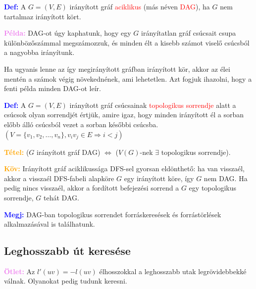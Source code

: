 \documentclass[../szamtud.tex]{subfiles}
\begin{document}
        \textcolor{blue}{\textbf{Def:}} A $G = (V,E)$ irányított gráf \textcolor{red}{aciklikus} (más néven \textcolor{red}{DAG}), ha $G$ nem tartalmaz irányított kört.

        \textcolor{violet}{\textbf{Példa:}} DAG-ot úgy kaphatunk, hogy egy $G$ irányítatlan gráf csúcsait csupa különbözőszámmal megszámozzuk, és minden élt a kisebb számot viselő csúcsból a nagyobba irányítunk.

        Ha ugyanis lenne az így megirányított gráfban irányított kör, akkor az élei mentén a számok végig növekednének, ami lehetetlen. Azt fogjuk ihazolni, hogy a fenti példa minden DAG-ot leír.

        \textcolor{blue}{\textbf{Def:}} A $G = (V,E)$ irányított gráf csúcsainak \textcolor{red}{topologikus sorrendje} alatt a csúcsok olyan sorrendjét értjük, amire igaz, hogy minden irányított él a sorban előbb álló csúcsból vezet a sorban későbbi csúcsba. $(V=\{v_1,v_2,\dots,v_n\},v_iv_j \in E \Rightarrow i < j)$

        \textcolor{orange}{\textbf{Tétel:}} ($G$ irányított gráf DAG) $\Leftrightarrow$ ($V(G)$-nek $\exists$ topologikus sorrendje).



        \textcolor{orange}{\textbf{Köv:}} Irányított gráf aciklikussága DFS-sel gyorsan eldönthető: ha van visszaél, akkor a visszaél DFS-fabeli alapköre $G$ egy irányított köre, így $G$ nem DAG. Ha pedig nincs visszaél, akkor a fordított befejezési sorrend a $G$ egy topologikus sorrendje, $G$ tehát DAG.

        \textcolor{blue}{\textbf{Megj:}} DAG-ban topologikus sorrendet forráskeresések és forrástörlések alkalmazásával is találhatunk.

    \subsection{Leghosszabb út keresése}

        \textcolor{violet}{\textbf{Ötlet:}} Az $l'(uv) = -l(uv)$ élhosszokkal a leghosszabb utak legrövidebbekké válnak. Olyanokat pedig tudunk keresni.
\end{document}
